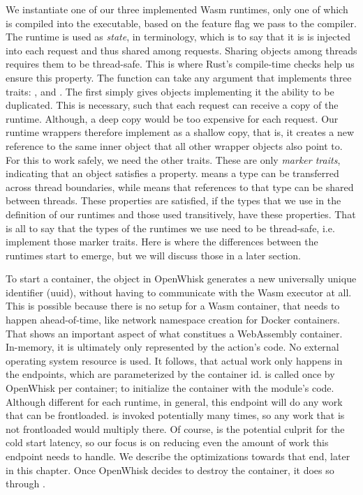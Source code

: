 We instantiate one of our three implemented Wasm runtimes, only one of which is compiled into the executable, based on the feature flag we pass to the compiler. The runtime is used as \emph{state}, in  terminology, which is to say that it is is injected into each request and thus shared among requests. Sharing objects among threads requires them to be thread-safe. This is where Rust's compile-time checks help us ensure this property. The  function can take any argument that implements three traits: ,  and . The first simply gives objects implementing it the ability to be duplicated. This is necessary, such that each request can receive a copy of the runtime. Although, a deep copy would be too expensive for each request. Our runtime wrappers therefore implement  as a shallow copy, that is, it creates a new reference to the same inner object that all other wrapper objects also point to. For this to work safely, we need the other traits. These are only \emph{marker traits}, indicating that an object satisfies a property.  means a type can be transferred across thread boundaries, while  means that references to that type can be shared between threads. These properties are satisfied, if the types that we use in the definition of our runtimes and those used transitively, have these properties. That is all to say that the types of the runtimes we use need to be thread-safe, i.e. implement those marker traits. Here is where the differences between the runtimes start to emerge, but we will discuss those in a later section.

To start a container, the  object in OpenWhisk generates a new universally unique identifier (uuid), without having to communicate with the Wasm executor at all. This is possible because there is no setup for a Wasm container, that needs to happen ahead-of-time, like network namespace creation for Docker containers.
That shows an important aspect of what constitues a WebAssembly container. In-memory, it is ultimately only represented by the action's code. No external operating system resource is used.
It follows, that actual work only happens in the endpoints, which are parameterized by the container id.  is called once by OpenWhisk per container; to initialize the container with the module's code. Although different for each runtime, in general, this endpoint will do any work that can be frontloaded.  is invoked potentially many times, so any work that is not frontloaded would multiply there. Of course,  is the potential culprit for the cold start latency, so our focus is on reducing even the amount of work this endpoint needs to handle. We describe the optimizations towards that end, later in this chapter. Once OpenWhisk decides to destroy the container, it does so through .

